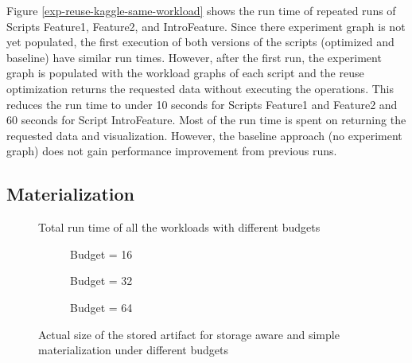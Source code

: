 Figure \ref{exp-reuse-kaggle-same-workload} shows the run time of repeated runs of Scripts Feature1,  Feature2, and IntroFeature.
Since there experiment graph is not yet populated, the first execution of both versions of the scripts (optimized and baseline) have similar run times.
However, after the first run, the experiment graph is populated with the workload graphs of each script and the reuse optimization returns the requested data without executing the operations.
This reduces the run time to under 10 seconds for Scripts Feature1 and Feature2 and 60 seconds for Script IntroFeature.
Most of the run time is spent on returning the requested data and visualization.
However, the baseline approach (no experiment graph) does not gain performance improvement from previous runs.

\subsection{Materialization}
\begin{figure}
\centering
 \resizebox{0.5\columnwidth}{!}{%
%
}
\caption{Total run time of all the workloads with different budgets}
\label{exp-runtime-vs-mat-budget}
\end{figure}

\begin{figure}
\begin{subfigure}[b]{0.33\linewidth}
\centering
 \resizebox{\columnwidth}{!}{%
%
}

\caption{Budget = 16}
\end{subfigure}%
\begin{subfigure}[b]{0.33\linewidth}
\centering
 \resizebox{\columnwidth}{!}{%
%
}

\caption{Budget = 32}
\end{subfigure}%
\begin{subfigure}[b]{0.33\linewidth}
\centering
 \resizebox{\columnwidth}{!}{%
%
}
\caption{Budget = 64}
\end{subfigure}
\caption{Actual size of the stored artifact for storage aware and simple materialization under different budgets }
\label{exp-sa-vs-simple-size}
\end{figure}

